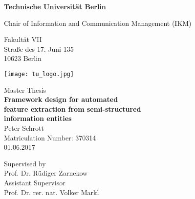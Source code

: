 \thispagestyle{empty}
\begin{center}

\vspace*{1.2cm}
{\LARGE \textbf{Technische Universität Berlin}}

\vspace{0.5cm}

{\large Chair of Information and Communication Management (IKM)\\[5mm]}

Fakultät VII\\
Straße des 17. Juni 135\\
10623 Berlin\\

\vspace*{1cm}

\texttt{[image: tu\_logo.jpg]}

\vspace*{1.0cm}

{\large Master Thesis}\\

\vspace{1.0cm}
{\LARGE \textbf{Framework design for automated}}\\
\vspace*{0.25cm}
{\LARGE \textbf{feature extraction from semi-structured}}\\
\vspace*{0.35cm}
{\LARGE \textbf{ information entities}}\\
\vspace*{1.0cm}
{\LARGE Peter Schrott}
\\
\vspace*{0.5cm}
Matriculation Number: 370314\\
01.06.2017\\ %
\vspace*{1.0cm}

Supervised by\\
Prof. Dr. Rüdiger Zarnekow\\
\vspace*{0.5cm}
Assistant Supervisor\\
Prof. Dr. rer. nat. Volker Markl
\vspace{3cm}

\end{center}